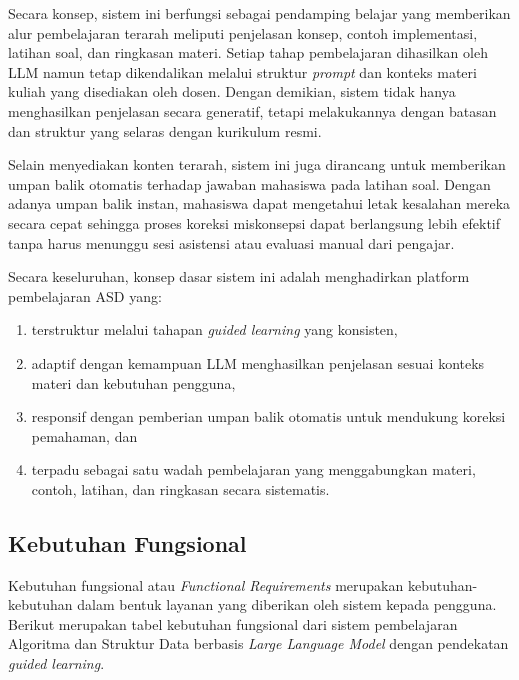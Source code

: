 Secara konsep, sistem ini berfungsi sebagai pendamping belajar yang memberikan alur pembelajaran terarah meliputi penjelasan konsep, contoh implementasi, latihan soal, dan ringkasan materi. Setiap tahap pembelajaran dihasilkan oleh LLM namun tetap dikendalikan melalui struktur \textit{prompt} dan konteks materi kuliah yang disediakan oleh dosen. Dengan demikian, sistem tidak hanya menghasilkan penjelasan secara generatif, tetapi melakukannya dengan batasan dan struktur yang selaras dengan kurikulum resmi.

Selain menyediakan konten terarah, sistem ini juga dirancang untuk memberikan umpan balik otomatis terhadap jawaban mahasiswa pada latihan soal. Dengan adanya umpan balik instan, mahasiswa dapat mengetahui letak kesalahan mereka secara cepat sehingga proses koreksi miskonsepsi dapat berlangsung lebih efektif tanpa harus menunggu sesi asistensi atau evaluasi manual dari pengajar.

Secara keseluruhan, konsep dasar sistem ini adalah menghadirkan platform pembelajaran ASD yang:

\begin{enumerate}
    \item terstruktur melalui tahapan \textit{guided learning} yang konsisten,
    \item adaptif dengan kemampuan LLM menghasilkan penjelasan sesuai konteks materi dan kebutuhan pengguna,
    \item responsif dengan pemberian umpan balik otomatis untuk mendukung koreksi pemahaman, dan
    \item terpadu sebagai satu wadah pembelajaran yang menggabungkan materi, contoh, latihan, dan ringkasan secara sistematis.
\end{enumerate}

\subsection{Kebutuhan Fungsional}

Kebutuhan fungsional atau \textit{Functional Requirements} merupakan kebutuhan-kebutuhan dalam bentuk layanan yang diberikan oleh sistem kepada pengguna. Berikut merupakan tabel kebutuhan fungsional dari sistem pembelajaran Algoritma dan Struktur Data berbasis \textit{Large Language Model} dengan pendekatan \textit{guided learning}.

